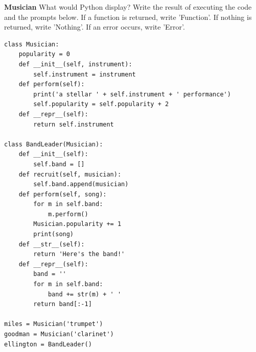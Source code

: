 \begin{blocksection}
\question \textbf{Musician} What would Python display? Write the result of executing the code and the prompts below. If a function is returned, write 'Function'. If nothing is returned, write 'Nothing'. If an error occurs, write 'Error'.

\begin{lstlisting}
class Musician:
    popularity = 0
    def __init__(self, instrument):
        self.instrument = instrument
    def perform(self):
        print('a stellar ' + self.instrument + ' performance')
        self.popularity = self.popularity + 2
    def __repr__(self):
        return self.instrument

class BandLeader(Musician):
    def __init__(self):
        self.band = []
    def recruit(self, musician):
        self.band.append(musician)
    def perform(self, song):
        for m in self.band:
            m.perform()
        Musician.popularity += 1
        print(song)
    def __str__(self):
        return 'Here's the band!'
    def __repr__(self):
        band = ''
        for m in self.band:
            band += str(m) + ' ' 
        return band[:-1]

miles = Musician('trumpet')
goodman = Musician('clarinet')
ellington = BandLeader()
\end{lstlisting}
\end{blocksection}

\newpage

